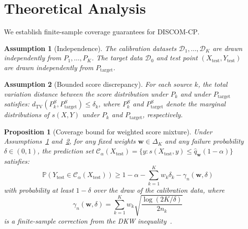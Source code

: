 \documentclass{article}
\newtheorem{proposition}{Proposition}
\newtheorem{assumption}{Assumption}
\newcommand{\Prob}{\mathbb{P}}
\newcommand{\calC}{\mathcal{C}}
\newcommand{\calD}{\mathcal{D}}
\newcommand{\dTV}{d_{\mathrm{TV}}}
\newcommand{\qhat}{\widehat{q}}
\newcommand{\simplex}{\Delta_{K}}
\newcommand{\DISCOM}{\textsc{DISCOM-CP}}
\begin{document}
\section{Theoretical Analysis}
\label{sec:theory}

We establish finite-sample coverage guarantees for \DISCOM{}.

\begin{assumption}[Independence]
\label{asm:independence}
The calibration datasets $\calD_1, \ldots, \calD_K$ are drawn independently from $P_1, \ldots, P_K$. The target data $\calD_0$ and test point $(X_{\text{test}}, Y_{\text{test}})$ are drawn independently from $P_{\text{target}}$.
\end{assumption}

\begin{assumption}[Bounded score discrepancy]
\label{asm:bounded_disc}
For each source $k$, the total variation distance between the score distribution under $P_k$ and under $P_{\text{target}}$ satisfies:
$\dTV(P_k^S, P_{\text{target}}^S) \leq \delta_k$,
where $P_k^S$ and $P_{\text{target}}^S$ denote the marginal distributions of $s(X, Y)$ under $P_k$ and $P_{\text{target}}$, respectively.
\end{assumption}

\begin{proposition}[Coverage bound for weighted score mixture]
\label{prop:coverage}
Under Assumptions~\ref{asm:independence} and~\ref{asm:bounded_disc}, for any fixed weights $\mathbf{w} \in \simplex$ and any failure probability $\delta \in (0,1)$, the prediction set $\calC_\alpha(X_{\text{test}}) = \{y : s(X_{\text{test}}, y) \leq \qhat_{\mathbf{w}}(1-\alpha)\}$ satisfies:
\begin{equation}
\label{eq:coverage_bound}
\Prob\!\left(Y_{\text{test}} \in \calC_\alpha(X_{\text{test}})\right) \geq 1 - \alpha - \sum_{k=1}^K w_k \delta_k - \gamma_n(\mathbf{w}, \delta)
\end{equation}
with probability at least $1 - \delta$ over the draw of the calibration data, where
\begin{equation}
\label{eq:gamma_def}
\gamma_n(\mathbf{w}, \delta) = \sum_{k=1}^K w_k \sqrt{\frac{\log(2K/\delta)}{2n_k}}
\end{equation}
is a finite-sample correction from the DKW inequality~\citep{massart1990tight}.
\end{proposition}
\end{document}

